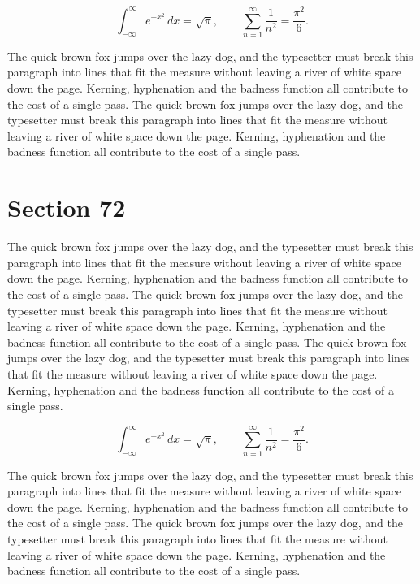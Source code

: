 \documentclass{article}
\begin{document}
\begin{equation}
\int_{-\infty}^{\infty} e^{-x^{2}}\,dx = \sqrt{\pi}, \qquad
\sum_{n=1}^{\infty} \frac{1}{n^{2}} = \frac{\pi^{2}}{6}.
\end{equation}

The quick brown fox jumps over the lazy dog, and the typesetter must break this paragraph into lines that fit the measure without leaving a river of white space down the page. Kerning, hyphenation and the badness function all contribute to the cost of a single pass. The quick brown fox jumps over the lazy dog, and the typesetter must break this paragraph into lines that fit the measure without leaving a river of white space down the page. Kerning, hyphenation and the badness function all contribute to the cost of a single pass. 
\section{Section 72}
The quick brown fox jumps over the lazy dog, and the typesetter must break this paragraph into lines that fit the measure without leaving a river of white space down the page. Kerning, hyphenation and the badness function all contribute to the cost of a single pass. The quick brown fox jumps over the lazy dog, and the typesetter must break this paragraph into lines that fit the measure without leaving a river of white space down the page. Kerning, hyphenation and the badness function all contribute to the cost of a single pass. The quick brown fox jumps over the lazy dog, and the typesetter must break this paragraph into lines that fit the measure without leaving a river of white space down the page. Kerning, hyphenation and the badness function all contribute to the cost of a single pass. 

\begin{equation}
\int_{-\infty}^{\infty} e^{-x^{2}}\,dx = \sqrt{\pi}, \qquad
\sum_{n=1}^{\infty} \frac{1}{n^{2}} = \frac{\pi^{2}}{6}.
\end{equation}

The quick brown fox jumps over the lazy dog, and the typesetter must break this paragraph into lines that fit the measure without leaving a river of white space down the page. Kerning, hyphenation and the badness function all contribute to the cost of a single pass. The quick brown fox jumps over the lazy dog, and the typesetter must break this paragraph into lines that fit the measure without leaving a river of white space down the page. Kerning, hyphenation and the badness function all contribute to the cost of a single pass. 
\end{document}
